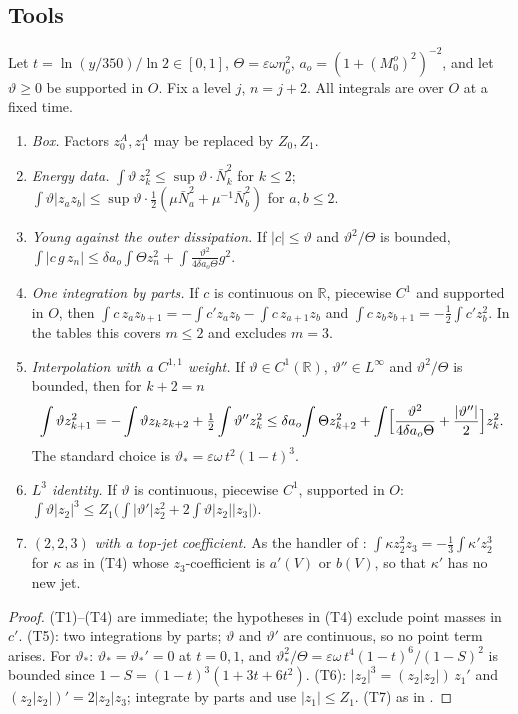 \documentclass[11pt]{article}
\theoremstyle{definition}\newtheorem{definition}[theorem]{Definition}
\theoremstyle{remark}\newtheorem{remark}[theorem]{Remark}
\newcommand{\fn}[1]{\texttt{\detokenize{#1}}}
\newcommand{\Nb}{\bar N}\newcommand{\oh}{\hat o}
\begin{document}
\subsection{Tools}
\begin{lemma}\label{lem:tools}
Let $t=\ln(y/350)/\ln2\in[0,1]$, $\Theta=\varepsilon\omega\eta_o^2$, $a_o=(1+(M_0^o)^2)^{-2}$, and let $\vartheta\ge0$ be supported in $O$. Fix a level $j$, $n=j+2$. All integrals are over $O$ at a fixed time.
\begin{enumerate}[label=(T\arabic*),leftmargin=2.6em,itemsep=2pt]
\item \emph{Box.} Factors $z^A_0,z^A_1$ may be replaced by $Z_0,Z_1$.
\item \emph{Energy data.} $\int\vartheta\,z_k^2\le\sup\vartheta\cdot\Nb_k^2$ for $k\le2$; $\int\vartheta|z_az_b|\le\sup\vartheta\cdot\frac12(\mu\Nb_a^2+\mu^{-1}\Nb_b^2)$ for $a,b\le2$.
\item \emph{Young against the outer dissipation.} If $|c|\le\vartheta$ and $\vartheta^2/\Theta$ is bounded, $\int|c\,g\,z_n|\le\delta a_o\!\int\Theta z_n^2+\int\frac{\vartheta^2}{4\delta a_o\Theta}g^2$.
\item \emph{One integration by parts.} If $c$ is continuous on $\mathbb R$, piecewise $C^1$ and supported in $O$, then $\int c\,z_a z_{b+1}=-\int c'z_az_b-\int c\,z_{a+1}z_b$ and $\int c\,z_bz_{b+1}=-\frac12\int c'z_b^2$. In the tables this covers $m\le2$ and excludes $m=3$.
\item \emph{Interpolation with a $C^{1,1}$ weight.} If $\vartheta\in C^1(\mathbb R)$, $\vartheta''\in L^\infty$ and $\vartheta^2/\Theta$ is bounded, then for $k+2=n$
\[
\int\vartheta z_{k+1}^2=-\int\vartheta z_kz_{k+2}+\tfrac12\int\vartheta''z_k^2\le\delta a_o\!\int\Theta z_{k+2}^2+\int\Bigl[\frac{\vartheta^2}{4\delta a_o\Theta}+\frac{|\vartheta''|}2\Bigr]z_k^2 .
\]
The standard choice is $\vartheta_\ast=\varepsilon\omega\,t^2(1-t)^3$.
\item \emph{$L^3$ identity.} If $\vartheta$ is continuous, piecewise $C^1$, supported in $O$: $\int\vartheta|z_2|^3\le Z_1\bigl(\int|\vartheta'|z_2^2+2\int\vartheta|z_2||z_3|\bigr)$.
\item \emph{$(2,2,3)$ with a top-jet coefficient.} As the handler \fn{ibp223} of \fn{ramp_rep.py}: $\int\kappa z_2^2z_3=-\frac13\int\kappa'z_2^3$ for $\kappa$ as in (T4) whose $z_3$-coefficient is $a'(V)$ or $b(V)$, so that $\kappa'$ has no new jet.
\end{enumerate}
\end{lemma}
\begin{proof}
(T1)--(T4) are immediate; the hypotheses in (T4) exclude point masses in $c'$. (T5): two integrations by parts; $\vartheta$ and $\vartheta'$ are continuous, so no point term arises. For $\vartheta_\ast$: $\vartheta_\ast=\vartheta_\ast'=0$ at $t=0,1$, and $\vartheta_\ast^2/\Theta=\varepsilon\omega\,t^4(1-t)^6/(1-S)^2$ is bounded since $1-S=(1-t)^3(1+3t+6t^2)$. (T6): $|z_2|^3=(z_2|z_2|)\,z_1'$ and $(z_2|z_2|)'=2|z_2|z_3$; integrate by parts and use $|z_1|\le Z_1$. (T7) as in \fn{ramp_rep.py}.
\end{proof}
\end{document}

